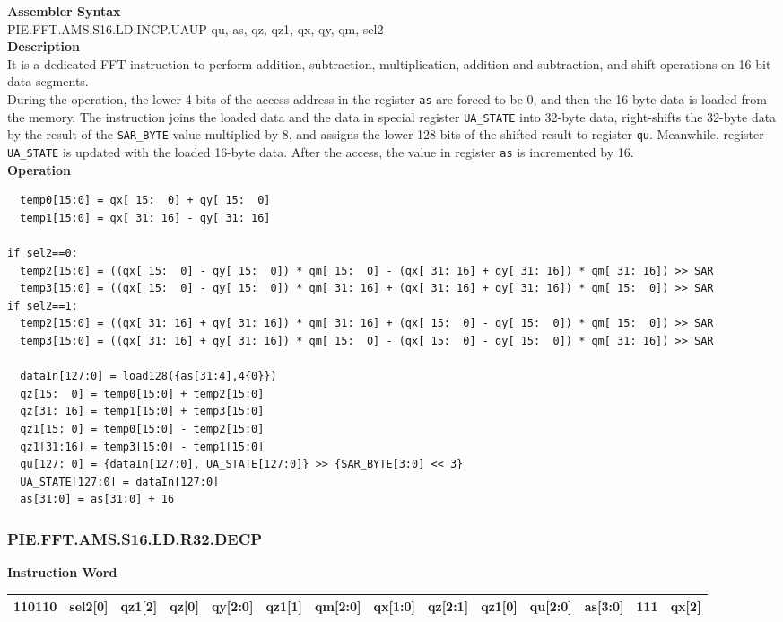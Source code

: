 \textbf{Assembler Syntax} \\
PIE.FFT.AMS.S16.LD.INCP.UAUP qu, as, qz, qz1, qx, qy, qm, sel2 \\
\textbf{Description} \\
It is a dedicated FFT instruction to perform addition, subtraction, multiplication, addition and subtraction, and shift operations on 16-bit data segments.\\
During the operation, the lower 4 bits of the access address in the register \lstinline{as} are forced to be 0, and then the 16-byte data is loaded from the memory. The instruction joins the loaded data and the data in special register \lstinline{UA_STATE} into 32-byte data, right-shifts the 32-byte data by the result of the \lstinline{SAR_BYTE} value multiplied by 8, and assigns the lower 128 bits of the shifted result to register \lstinline{qu}. Meanwhile, register \lstinline{UA_STATE} is updated with the loaded 16-byte data. After the access, the value in register \lstinline{as} is incremented by 16.\\
\textbf{Operation}
\begin{lstlisting}
  temp0[15:0] = qx[ 15:  0] + qy[ 15:  0]
  temp1[15:0] = qx[ 31: 16] - qy[ 31: 16]

if sel2==0:
  temp2[15:0] = ((qx[ 15:  0] - qy[ 15:  0]) * qm[ 15:  0] - (qx[ 31: 16] + qy[ 31: 16]) * qm[ 31: 16]) >> SAR
  temp3[15:0] = ((qx[ 15:  0] - qy[ 15:  0]) * qm[ 31: 16] + (qx[ 31: 16] + qy[ 31: 16]) * qm[ 15:  0]) >> SAR
if sel2==1:
  temp2[15:0] = ((qx[ 31: 16] + qy[ 31: 16]) * qm[ 31: 16] + (qx[ 15:  0] - qy[ 15:  0]) * qm[ 15:  0]) >> SAR
  temp3[15:0] = ((qx[ 31: 16] + qy[ 31: 16]) * qm[ 15:  0] - (qx[ 15:  0] - qy[ 15:  0]) * qm[ 31: 16]) >> SAR

  dataIn[127:0] = load128({as[31:4],4{0}})
  qz[15:  0] = temp0[15:0] + temp2[15:0]
  qz[31: 16] = temp1[15:0] + temp3[15:0]
  qz1[15: 0] = temp0[15:0] - temp2[15:0]
  qz1[31:16] = temp3[15:0] - temp1[15:0]
  qu[127: 0] = {dataIn[127:0], UA_STATE[127:0]} >> {SAR_BYTE[3:0] << 3}
  UA_STATE[127:0] = dataIn[127:0]
  as[31:0] = as[31:0] + 16
\end{lstlisting}

\newpage
\subsubsection{PIE.FFT.AMS.S16.LD.R32.DECP}\label{instruction:PIEFFTAMSS16LDR32DECP}
\setlength\tabcolsep{5pt}
\textbf{Instruction Word} \\
\begin{tabular}{|c|c|c|c|c|c|c|c|c|c|c|c|c|c|}
	\hline
	110110 & sel2[0] & qz1[2] & qz[0] & qy[2:0] & qz1[1] & qm[2:0] & qx[1:0] & qz[2:1] & qz1[0] & qu[2:0] & as[3:0] & 111 & qx[2] \\
	\hline
\end{tabular}

